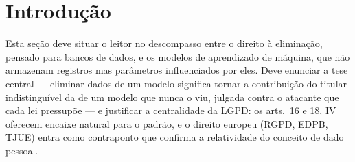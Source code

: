 \section{Introdução}


Esta seção deve situar o leitor no descompasso entre o direito à eliminação,
pensado para bancos de dados, e os modelos de aprendizado de máquina, que não
armazenam registros mas parâmetros influenciados por eles. Deve enunciar a tese
central --- eliminar dados de um modelo significa tornar a contribuição do
titular indistinguível da de um modelo que nunca o viu, julgada contra o
atacante que cada lei pressupõe --- e justificar a centralidade da LGPD: os
arts.~16 e 18, IV oferecem encaixe natural para o padrão, e o direito europeu
(RGPD, EDPB, TJUE) entra como contraponto que confirma a relatividade do
conceito de dado pessoal.

